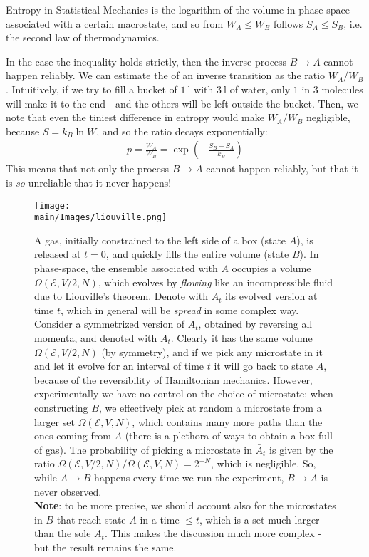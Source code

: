 \documentclass[../../main.tex]{subfiles}
\begin{document}
\medskip

Entropy in Statistical Mechanics is the logarithm of the volume in phase-space associated with a certain macrostate, and so from $W_A \leq W_B$ follows $S_A \leq S_B$, i.e. the second law of thermodynamics.

\medskip

In the case the inequality holds strictly, then the inverse process $B \to A$ cannot happen reliably. We can estimate the  of an inverse transition as the ratio $W_A/W_B$. Intuitively, if we try to fill a bucket of $\SI{1}{\l}$ with $\SI{3}{\l}$ of water, only $1$ in $3$ molecules will make it to the end - and the others will be left outside the bucket. Then, we note that even the tiniest difference in entropy would make $W_A/W_B$ negligible, because $S = k_B \ln W$, and so the ratio decays exponentially:
\begin{align*}
    p = \frac{W_A}{W_B} = \exp\left(-\frac{S_B - S_A}{k_B} \right) 
\end{align*}
This means that not only the process $B \to A$ cannot happen reliably, but that it is \textit{so} unreliable that it never happens!

\begin{figure}[H]
    \centering
    \texttt{[image: \\main/Images/liouville.png]}
    \caption{A gas, initially constrained to the left side of a box (state $A$), is released at $t=0$, and quickly fills the entire volume (state $B$). In phase-space, the ensemble associated with $A$ occupies a volume $\Omega(\mathcal{E}, V/2, N)$, which evolves by \textit{flowing} like an incompressible fluid due to Liouville's theorem. Denote with $A_t$ its evolved version at time $t$, which in general will be \textit{spread} in some complex way. Consider a symmetrized version of $A_t$, obtained by reversing all momenta, and denoted with $\bar{A}_t$. Clearly it has the same volume $\Omega(\mathcal{E}, V/2, N)$ (by symmetry), and if we pick any microstate in it and let it evolve for an interval of time $t$ it will go back to state $A$, because of the reversibility of Hamiltonian mechanics. However, experimentally we have no control on the choice of microstate: when constructing $B$, we effectively pick at random a microstate from a larger set $\Omega(\mathcal{E}, V, N)$, which contains many more paths than the ones coming from $A$ (there is a plethora of ways to obtain a box full of gas). The probability of picking a microstate in $\bar{A}_t$ is given by the ratio $\Omega(\mathcal{E}, V/2, N)/\Omega(\mathcal{E}, V, N) = 2^{-N}$, which is negligible. So, while $A \to B$ happens every time we run the experiment, $B \to A$ is never observed.\\\hspace{\textwidth}
    \textbf{Note}: to be more precise, we should account also for the microstates in $B$ that reach state $A$ in a time $\leq t$, which is a set much larger than the sole $\bar{A}_t$. This makes the discussion much more complex - but the result remains the same.}
    \label{fig:liouville-irreversibility}
\end{figure}
\end{document}
